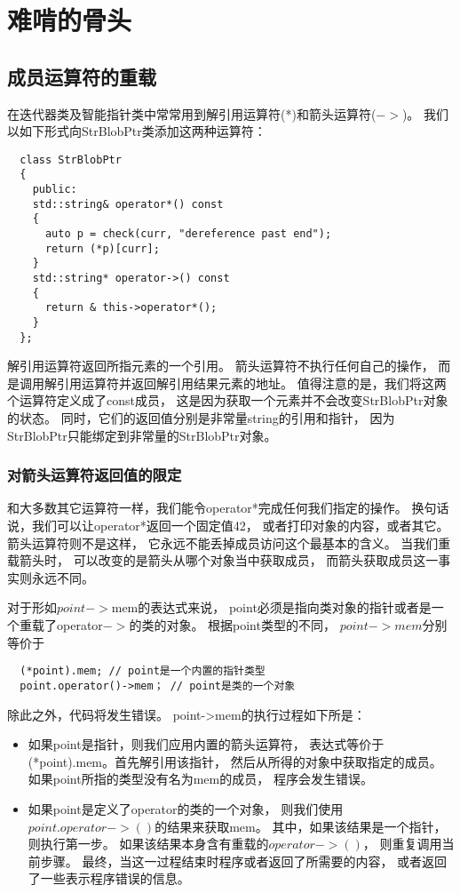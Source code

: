 \chapter{难啃的骨头}
\section{成员运算符的重载}
在迭代器类及智能指针类中常常用到解引用运算符(*)和箭头运算符($->$)。%
我们以如下形式向StrBlobPtr类添加这两种运算符：
\begin{lstlisting}
  class StrBlobPtr
  {
    public:
    std::string& operator*() const
    {
      auto p = check(curr, "dereference past end");
      return (*p)[curr];
    }
    std::string* operator->() const
    {
      return & this->operator*();
    }
  };
\end{lstlisting}
解引用运算符返回所指元素的一个引用。%
箭头运算符不执行任何自己的操作，%
而是调用解引用运算符并返回解引用结果元素的地址。%
值得注意的是，我们将这两个运算符定义成了const成员，%
这是因为获取一个元素并不会改变StrBlobPtr对象的状态。%
同时，它们的返回值分别是非常量string的引用和指针，%
因为StrBlobPtr只能绑定到非常量的StrBlobPtr对象。%
\subsection{对箭头运算符返回值的限定}
和大多数其它运算符一样，我们能令operator*完成任何我们指定的操作。%
换句话说，我们可以让operator*返回一个固定值42，%
或者打印对象的内容，或者其它。%
箭头运算符则不是这样，%
它永远不能丢掉成员访问这个最基本的含义。%
当我们重载箭头时，%
可以改变的是箭头从哪个对象当中获取成员，%
而箭头获取成员这一事实则永远不同。%
\par
对于形如$point->$mem的表达式来说，%
point必须是指向类对象的指针或者是一个重载了operator$->$的类的对象。%
根据point类型的不同，%
$point->mem$分别等价于
\begin{lstlisting}
  (*point).mem; // point是一个内置的指针类型
  point.operator()->mem； // point是类的一个对象
\end{lstlisting}
除此之外，代码将发生错误。%
point->mem的执行过程如下所是：
\begin{itemize}
\item{如果point是指针，则我们应用内置的箭头运算符，%
    表达式等价于(*point).mem。首先解引用该指针，%
    然后从所得的对象中获取指定的成员。%
    如果point所指的类型没有名为mem的成员，%
    程序会发生错误。
  }
\item{如果point是定义了operator的类的一个对象，%
    则我们使用$point.operator->()$的结果来获取mem。%
    其中，如果该结果是一个指针，则执行第一步。%
    如果该结果本身含有重载的$operator->()$，%
    则重复调用当前步骤。%
    最终，当这一过程结束时程序或者返回了所需要的内容，%
    或者返回了一些表示程序错误的信息。
  }
\end{itemize}

